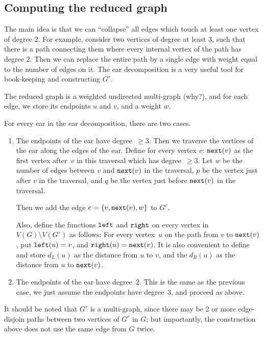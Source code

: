 \subsection{Computing the reduced graph}
The main idea is that we can ``collapse'' all edges which touch at least
one vertex of degree $2$.
For example, consider two vertices of degree at least $3$, such that there
is a path connecting them where every internal vertex of the path has
degree $2$. Then we can replace the entire path by a single edge with weight
equal to the number of edges on it.
The ear decomposition is a very useful tool for book-keeping and constructing
$G^r$.

The reduced graph is a weighted undirected multi-graph (why?), and for each
edge, we store its endpoints $u$ and $v$, and a weight $w$.

For every ear in the ear decomposition, there are two cases.
\begin{enumerate}[I]
	\item
		The endpoints of the ear have degree~$\geq 3$. Then we traverse the
		vertices of the ear along the edges of the ear. 
		Define for every vertex $v$: $\texttt{next}(v)$ as the first vertex
		after~$v$ in this traversal which has degree~$\geq 3$.
		Let $w$ be the number of edges between $v$ and $\texttt{next}(v)$ in
		the traversal, $p$ be the vertex just after $v$ in the traversal,
		and $q$ be the vertex just before $\texttt{next}(v)$ in the traversal.

		Then we add the edge $e = \left\{ v, \texttt{next}(v), w \right\}$
		to $G^r$.

		Also, define the functions $\texttt{left}$ and $\texttt{right}$ on
		every vertex in $V(G) \setminus V(G^r)$ as follows:
		For every vertex~$u$ on the path from $v$ to $\texttt{next}(v)$,
		put $\texttt{left}(u) = v$, and $\texttt{right}(u) = \texttt{next}(v)$.
		It is also convenient to define and store $d_L(u)$ as the distance
		from $u$ to $v$, and the $d_R(u)$ as the distance from $u$ to
		$\texttt{next}(v)$.
	\item
		The endpoints of the ear have degree~$2$.  This is the same as
		the previous case, we just assume the endpoints have degree~$3$,
		and proceed as above.
\end{enumerate}

It should be noted that $G^r$ is a multi-graph, since there may be 2 or more
edge-disjoin paths between two vertices of $G^r$ in $G$;
but importantly, the construction above does not use the same edge from $G$
twice.

